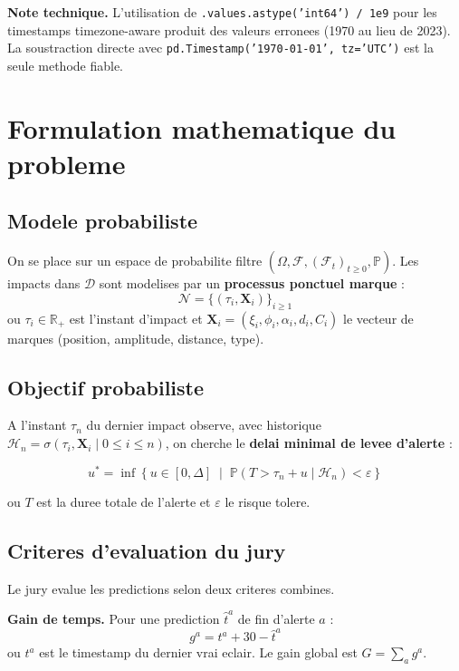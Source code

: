 \documentclass[a4paper,11pt]{article}
\begin{document}
\textbf{Note technique.} L'utilisation de \texttt{.values.astype('int64') / 1e9}
pour les timestamps timezone-aware produit des valeurs erronees (1970 au lieu
de 2023). La soustraction directe avec \texttt{pd.Timestamp('1970-01-01',
tz='UTC')} est la seule methode fiable.

\section{Formulation mathematique du probleme}

\subsection{Modele probabiliste}

On se place sur un espace de probabilite filtre
$(\Omega, \mathcal{F}, (\mathcal{F}_t)_{t\geq 0}, \mathbb{P})$. Les impacts
dans $\mathcal{D}$ sont modelises par un \textbf{processus ponctuel marque} :
\[
\mathcal{N} = \{(\tau_i, \mathbf{X}_i)\}_{i \geq 1}
\]
ou $\tau_i \in \mathbb{R}_+$ est l'instant d'impact et
$\mathbf{X}_i = (\xi_i, \phi_i, \alpha_i, d_i, C_i)$ le vecteur de marques
(position, amplitude, distance, type).

\subsection{Objectif probabiliste}

A l'instant $\tau_n$ du dernier impact observe, avec historique
$\mathcal{H}_n = \sigma(\tau_i, \mathbf{X}_i \mid 0 \leq i \leq n)$, on
cherche le \textbf{delai minimal de levee d'alerte} :

\[
\boxed{u^* = \inf\left\{u \in [0, \Delta] \;\middle|\;
\mathbb{P}(T > \tau_n + u \mid \mathcal{H}_n) < \varepsilon \right\}}
\]

ou $T$ est la duree totale de l'alerte et $\varepsilon$ le risque tolere.

\subsection{Criteres d'evaluation du jury}

Le jury evalue les predictions selon deux criteres combines.

\textbf{Gain de temps.} Pour une prediction $\hat{t}^a$ de fin d'alerte $a$ :
\[
g^a = t^a + 30 - \hat{t}^a
\]
ou $t^a$ est le timestamp du dernier vrai eclair. Le gain global est
$G = \sum_a g^a$.
\end{document}
